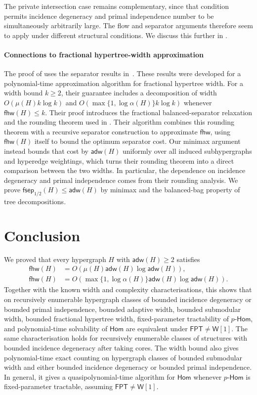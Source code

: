 \documentclass[11pt,letterpaper]{article}
\theoremstyle{definition}
\theoremstyle{remark}
\newcommand{\Hom}{\mathsf{Hom}}
\newcommand{\pHom}{p\text{-}\mathsf{Hom}}
\newcommand{\fhw}{\mathsf{fhw}}
\newcommand{\adw}{\mathsf{adw}}
\newcommand{\fsep}{\mathsf{fsep}}
\newcommand{\FPT}{\ensuremath{\mathsf{FPT}}}
\newcommand{\wone}{\ensuremath{\mathsf{W}[1]}}
\providecommand{\adw}{\operatorname{adw}}
\providecommand{\fhw}{\operatorname{fhw}}
\providecommand{\FPT}{\ensuremath{\mathsf{FPT}}}
\begin{document}
The private intersection case remains complementary, since that condition permits incidence degeneracy and primal independence number to be simultaneously arbitrarily large. The flow and separator arguments therefore seem to apply under different structural
conditions. We discuss this further in
.

\paragraph{Connections to fractional hypertree-width approximation}
The proof of  uses the separator results in~\cite{KorchemnaEtAl2024}. These results were developed for a polynomial-time approximation algorithm for fractional hypertree width. For a width bound
$k\ge2$, their guarantee includes a decomposition of width
$O(\mu(H)k\log k)$ and $O(\max\{1,\log\alpha(H)\}k\log k)$ whenever $\fhw(H)\le k$.
Their proof introduces the fractional balanced-separator relaxation and
the rounding theorem used in . Their algorithm combines
this rounding theorem with a recursive separator construction to approximate
$\fhw$, using $\fhw(H)$ itself to bound the optimum separator cost. Our
minimax argument instead bounds that cost by $\adw(H)$ uniformly over all
induced subhypergraphs and hyperedge weightings, which turns their rounding
theorem into a direct comparison between the two widths. In particular, the
dependence on incidence degeneracy and primal independence comes
from their rounding analysis. We prove
$\fsep_{1/2}(H)\le\adw(H)$ by minimax and the balanced-bag property of
tree decompositions.
\section{Conclusion}
\label{sec:conclusion}

We proved that every hypergraph $H$ with $\adw(H)\ge2$ satisfies
\[
 \begin{aligned}
 \fhw(H)&=O\!\left(\mu(H)\adw(H)\log\adw(H)\right),\\
 \fhw(H)&=O\!\left(\max\{1,\log\alpha(H)\}\adw(H)\log\adw(H)\right).
 \end{aligned}
\]
Together with the known width and complexity characterisations, this shows
that on recursively enumerable hypergraph classes of bounded incidence
degeneracy or bounded primal independence,
bounded adaptive width, bounded submodular width, bounded fractional
hypertree width, fixed-parameter tractability of $\pHom$, and polynomial-time
solvability of $\Hom$ are equivalent under $\FPT\ne \wone$. The same characterisation
holds for recursively enumerable classes of structures with bounded
incidence degeneracy after taking cores. The width bound also gives
polynomial-time exact counting on hypergraph classes of bounded submodular
width and either bounded incidence degeneracy or bounded primal independence.
In general, it gives a quasipolynomial-time
algorithm for $\Hom$ whenever $\pHom$ is fixed-parameter tractable, assuming
$\FPT\ne \wone$.
\end{document}
